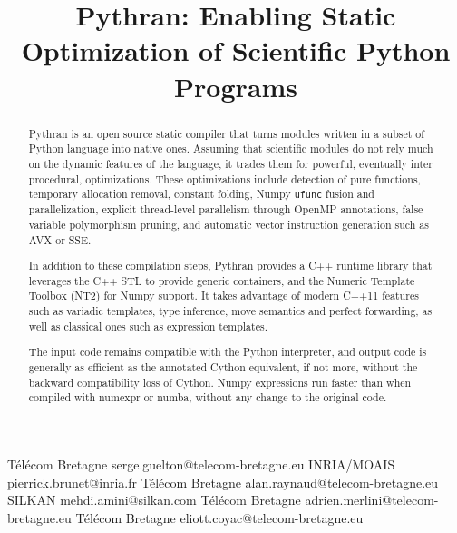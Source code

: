 \documentclass[10pt, onecolumn, preprint]{sigplanconf}
\begin{document}
\title{Pythran: Enabling Static Optimization of Scientific Python Programs}

           {T{\'e}l{\'e}com Bretagne}
           {serge.guelton@telecom-bretagne.eu}
           {INRIA/MOAIS}
           {pierrick.brunet@inria.fr}
           {T{\'e}l{\'e}com Bretagne}
           {alan.raynaud@telecom-bretagne.eu}
           {SILKAN}
           {mehdi.amini@silkan.com}
           {T{\'e}l{\'e}com Bretagne}
           {adrien.merlini@telecom-bretagne.eu}
           {T{\'e}l{\'e}com Bretagne}
           {eliott.coyac@telecom-bretagne.eu}

\maketitle

\begin{abstract}

    Pythran is an open source static compiler that turns modules written
    in a subset of Python language into native ones. Assuming that scientific
    modules do not rely much on the dynamic features of the language, it trades
    them for powerful, eventually inter procedural, optimizations.
    These optimizations include detection of pure functions, temporary
    allocation removal,
    constant folding, Numpy \texttt{ufunc} fusion and parallelization, explicit
    thread-level parallelism through OpenMP annotations, false variable
    polymorphism pruning, and automatic vector instruction generation such as
    AVX or SSE.

    In addition to these compilation steps, Pythran provides a C++ runtime 
    library that
    leverages the C++ STL to provide generic containers, and the Numeric 
    Template Toolbox (NT2) for Numpy support. It takes advantage of modern C++11
    features such as variadic templates, type inference, move semantics and
    perfect forwarding, as well as classical ones such as expression templates.
    

    The input code remains compatible with the Python interpreter, and output
    code is generally as efficient as the annotated Cython equivalent, if not
    more, %
    without the backward compatibility loss of Cython. Numpy expressions
    run faster than when compiled with numexpr or numba, without any change to
    the original code. 


\end{abstract}
\end{document}
